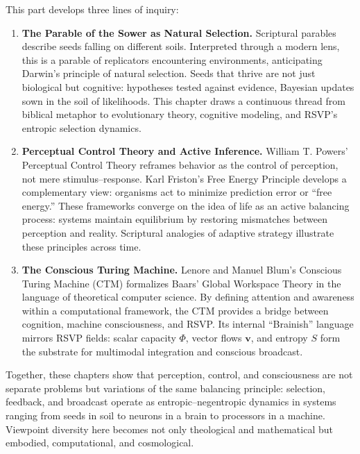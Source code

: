 \documentclass[a4paper,11pt,openany]{book}
\begin{document}
This part develops three lines of inquiry:

\begin{enumerate}
  \item \textbf{The Parable of the Sower as Natural Selection.}  
  Scriptural parables describe seeds falling on different soils. Interpreted through a modern 
  lens, this is a parable of replicators encountering environments, anticipating Darwin’s 
  principle of natural selection. Seeds that thrive are not just biological but cognitive: 
  hypotheses tested against evidence, Bayesian updates sown in the soil of likelihoods.  
  This chapter draws a continuous thread from biblical metaphor to evolutionary theory, 
  cognitive modeling, and RSVP’s entropic selection dynamics.

  \item \textbf{Perceptual Control Theory and Active Inference.}  
  William T. Powers’ Perceptual Control Theory reframes behavior as the control of 
  perception, not mere stimulus–response. Karl Friston’s Free Energy Principle develops a 
  complementary view: organisms act to minimize prediction error or “free energy.”  
  These frameworks converge on the idea of life as an active balancing process: systems 
  maintain equilibrium by restoring mismatches between perception and reality. Scriptural 
  analogies of adaptive strategy illustrate these principles across time.

  \item \textbf{The Conscious Turing Machine.}  
  Lenore and Manuel Blum’s Conscious Turing Machine (CTM) formalizes Baars’ Global 
  Workspace Theory in the language of theoretical computer science. By defining attention and 
  awareness within a computational framework, the CTM provides a bridge between cognition, 
  machine consciousness, and RSVP. Its internal “Brainish” language mirrors RSVP fields: 
  scalar capacity $\Phi$, vector flows $\mathbf{v}$, and entropy $S$ form the substrate for 
  multimodal integration and conscious broadcast.
\end{enumerate}

Together, these chapters show that perception, control, and consciousness are not separate 
problems but variations of the same balancing principle: selection, feedback, and broadcast 
operate as entropic–negentropic dynamics in systems ranging from seeds in soil to neurons in 
a brain to processors in a machine. Viewpoint diversity here becomes not only theological and 
mathematical but embodied, computational, and cosmological.
\end{document}
